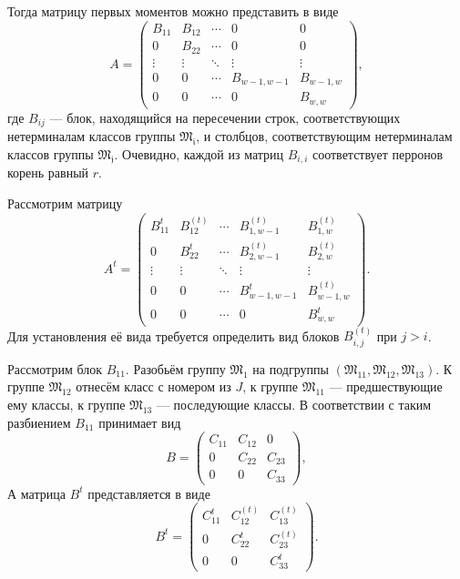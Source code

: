 \documentclass[11pt]{article}
\begin{document}
Тогда матрицу первых моментов можно представить в виде
\begin{equation}
    A = 
    \begin{pmatrix}
        B_{11} & B_{12} & \cdots & 0 & 0 \\
        0 & B_{22} & \cdots & 0 & 0 \\
        \vdots & \vdots & \ddots & \vdots & \vdots \\
        0 & 0 & \cdots & B_{w-1,w-1} & B_{w-1,w} \\
        0 & 0 & \cdots & 0 & B_{w,w}
    \end{pmatrix},
\end{equation}
где $B_{ij}$ --- блок, находящийся на пересечении строк, соответствующих нетерминалам классов группы $\mathfrak{M_i}$, и столбцов, соответствующим нетерминалам классов группы $\mathfrak{M_j}$. Очевидно, каждой из матриц $B_{i,i}$ соответствует перронов корень равный $r$.

Рассмотрим матрицу
\begin{equation}
    A^t = 
    \begin{pmatrix}
        B_{11}^t & B_{12}^{(t)} & \cdots & B_{1,w-1}^{(t)} & B_{1,w}^{(t)} \\
        0 & B_{22}^t & \cdots & B_{2,w-1}^{(t)} & B_{2,w}^{(t)} \\
        \vdots & \vdots & \ddots & \vdots & \vdots \\
        0 & 0 & \cdots & B_{w-1,w-1}^t & B_{w-1,w}^{(t)} \\
        0 & 0 & \cdots & 0 & B_{w,w}^t
    \end{pmatrix}.
\end{equation}
Для установления её вида требуется определить вид блоков $B_{i,j}^{(t)}$ при $j > i$.

Рассмотрим блок $B_{11}$. Разобьём группу $\mathfrak{M_1}$ на подгруппы $(\mathfrak{M_{11}}, \mathfrak{M_{12}}, \mathfrak{M_{13}})$. К группе $\mathfrak{M_{12}}$ отнесём класс с номером из $J$, к группе $\mathfrak{M_{11}}$ --- предшествующие ему классы, к группе $\mathfrak{M_{13}}$ --- последующие классы. В соответствии с таким разбиением $B_{11}$ принимает вид
\begin{equation}
    B = 
    \begin{pmatrix}
        C_{11} & C_{12} & 0 \\
        0 & C_{22} & C_{23} \\
        0 & 0 & C_{33}
    \end{pmatrix},
\end{equation}
А матрица $B^t$ представляется в виде
\begin{equation}
    B^t = 
    \begin{pmatrix}
        C_{11}^t & C_{12}^{(t)} & C_{13}^{(t)} \\
        0 & C_{22}^t & C_{23}^{(t)} \\
        0 & 0 & C_{33}^t
    \end{pmatrix}.
\end{equation}
\end{document}
